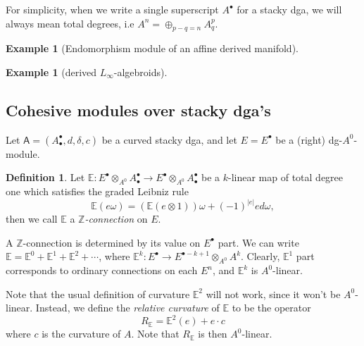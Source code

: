 \documentclass[12pt]{amsart}
\theoremstyle{definition}
\newtheorem{example}[thm]{Example}
\newtheorem{defn}[thm]{Definition}
\theoremstyle{remark}
\numberwithin{equation}{section}
\newcommand{\Z}{{\mathbb{Z}}}
\newcommand{\1}{{\mathbb{1}}}
\newcommand{\bt}{\bullet}
\begin{document}
For simplicity, when we write a single superscript $A^{\bt}$ for a stacky dga, we will always mean total degrees, i.e $A^n = \oplus_{p-q=n} A^p_q$.

\begin{example}[Endomorphism module of an affine derived manifold]
    
\end{example}

\begin{example}[derived $L_{\infty}$-algebroids]
    
\end{example}


\subsection{Cohesive modules over stacky dga's}
Let $\mathsf{A} = (A^{\bullet}_{\bullet}, d, \delta, c)$ be a curved stacky dga, and let $E= E^{\bullet}$ be a (right) dg-$A^0$-module.
\begin{defn}
    Let  $\mathbb{E}: E^{\bullet}\otimes_{ {A}^0} A^{\bullet}_{\bullet} \to E^{\bullet}\otimes_{{A}^0} A^{\bullet}_{\bullet}$ be a $k$-linear map of total degree one which satisfies the graded Leibniz rule
    \begin{equation*}
        \mathbb{E}(e\omega) = (\mathbb{E}(e\otimes 1))\omega + (-1)^{|e|}ed\omega,
    \end{equation*}
    then we call $\mathbb{E}$ a {\it $\Z$-connection}\index{connection!$\Z$-} on $E$.
\end{defn}

A $\Z$-connection is determined by its value on $E^{\bullet}$ part. We can write $\mathbb{E} = \mathbb{E}^0 + \mathbb{E}^1 + \mathbb{E}^2+ \cdots$, where $\mathbb{E}^k:  E^{\bullet}\to E^{\bullet - k + 1}\otimes_{{A}^0} {A}^{k}$. Clearly, $\mathbb{E}^1$ part corresponds to ordinary connections on each $E^n$, and $\mathbb{E}^k$ is $A^0$-linear. 

Note that the usual definition of curvature $\mathbb{E}^2$ will not work, since it won't be ${A}^0$-linear. Instead, we define the {\it relative curvature} of $\mathbb{E}$ to be the operator 
\begin{equation*}
    R_{\mathbb{E}} = \mathbb{E}^2(e) + e\cdot c
\end{equation*}
where $c$ is the curvature of ${A}$. Note that $R_{\mathbb{E}}$ is then $A^0$-linear.
\end{document}
